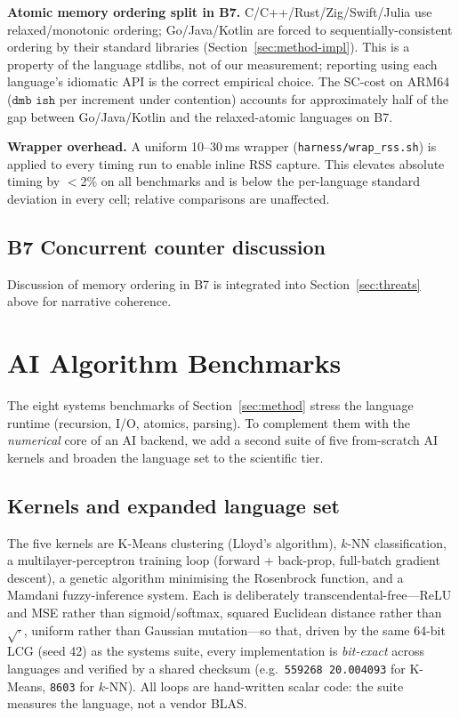 \documentclass[10pt,conference]{IEEEtran}
\begin{document}
\textbf{Atomic memory ordering split in B7.} C/C++/Rust/Zig/Swift/Julia
use relaxed/monotonic ordering; Go/Java/Kotlin are forced to
sequentially-consistent ordering by their standard libraries
(Section~\ref{sec:method-impl}). This is a property of the
language stdlibs, not of our measurement; reporting using each
language's idiomatic API is the correct empirical choice. The
SC-cost on ARM64 ($\texttt{dmb ish}$ per increment under
contention) accounts for approximately half of the gap between
Go/Java/Kotlin and the relaxed-atomic languages on B7.

\textbf{Wrapper overhead.} A uniform 10--30\,ms wrapper
(\texttt{harness/wrap\_rss.sh}) is applied to every timing run to
enable inline RSS capture. This elevates absolute timing by
$<$2\% on all benchmarks and is below the per-language standard
deviation in every cell; relative comparisons are unaffected.

\subsection{B7 Concurrent counter discussion}
\label{sec:disc-b7}

Discussion of memory ordering in B7 is integrated into
Section~\ref{sec:threats} above for narrative coherence.

\section{AI Algorithm Benchmarks}
\label{sec:ai-suite}

The eight systems benchmarks of Section~\ref{sec:method} stress the
language runtime (recursion, I/O, atomics, parsing). To complement them with
the \emph{numerical} core of an AI backend, we add a second suite of five
from-scratch AI kernels and broaden the language set to the scientific tier.

\subsection{Kernels and expanded language set}
The five kernels are K-Means clustering (Lloyd's algorithm), $k$-NN
classification, a multilayer-perceptron training loop (forward + back-prop,
full-batch gradient descent), a genetic algorithm minimising the Rosenbrock
function, and a Mamdani fuzzy-inference system. Each is deliberately
transcendental-free---ReLU and MSE rather than sigmoid/softmax, squared
Euclidean distance rather than $\sqrt{\cdot}$, uniform rather than Gaussian
mutation---so that, driven by the same 64-bit LCG (seed 42) as the systems
suite, every implementation is \emph{bit-exact} across languages and verified
by a shared checksum (e.g.\ \texttt{559268 20.004093} for K-Means,
\texttt{8603} for $k$-NN). All loops are hand-written scalar code: the suite
measures the language, not a vendor BLAS.
\end{document}
